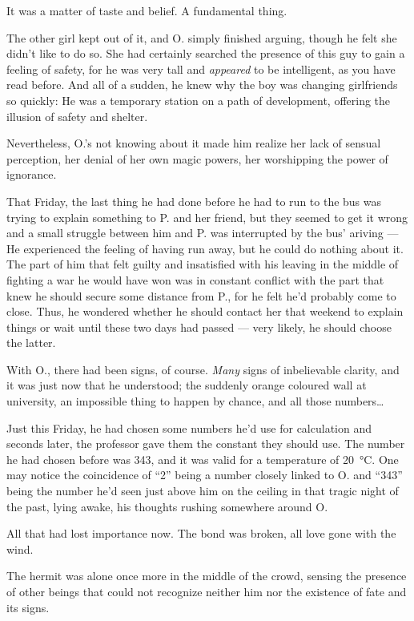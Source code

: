 It was a matter of taste and belief. 
A fundamental thing.

The other girl kept out of it, and O. simply finished arguing, though he felt she didn't like to do so. She had certainly searched the presence of this guy to gain a feeling of safety, for he was very tall and \emph{appeared} to be intelligent, as you have read before. And all of a sudden, he knew why the boy was changing girlfriends so quickly: He was a temporary station on a path of development, offering the illusion of safety and shelter.

Nevertheless, O.'s not knowing about it made him realize her lack of sensual perception, her denial of her own magic powers, her worshipping the power of ignorance.

That Friday, the last thing he had done before he had to run to the bus was trying to explain something to P. and her friend, but they seemed to get it wrong and a small struggle between him and P. was interrupted by the bus' ariving --- He experienced the feeling of having run away, but he could do nothing about it. The part of him that felt guilty and insatisfied with his leaving in the middle of fighting a war he would have won was in constant conflict with the part that knew he should secure some distance from P., for he felt he'd probably come to close. Thus, he wondered whether he should contact her that weekend to explain things or wait until these two days had passed --- very likely, he should choose the latter.

With O., there had been signs, of course. \emph{Many} signs of inbelievable clarity, and it was just now that he understood; the suddenly orange coloured wall at university, an impossible thing to happen by chance, and all those numbers\dots{}

Just this Friday, he had chosen some numbers he'd use for calculation and seconds later, the professor gave them the constant they should use. The number he had chosen before was 343, and it was valid for a temperature of \SI{20}{\celsius}. One may notice the coincidence of \enquote{2} being a number closely linked to O. and \enquote{343} being the number he'd seen just above him on the ceiling in that tragic night of the past, lying awake, his thoughts rushing somewhere around O.

All that had lost importance now. The bond was broken, all love gone with the wind.

The hermit was alone once more in the middle of the crowd, sensing the presence of other beings that could not recognize neither him nor the existence of fate and its signs.

